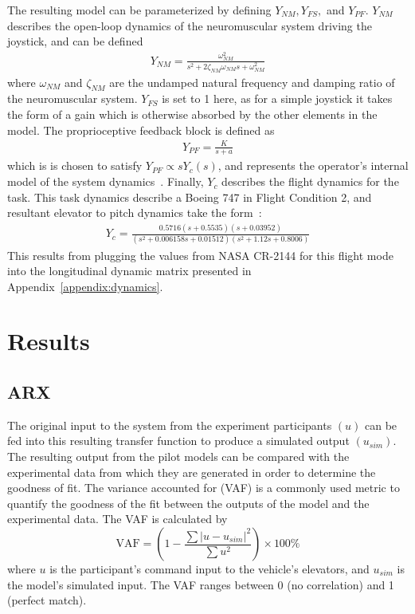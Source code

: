 The resulting model can be parameterized by defining $Y_{NM}, Y_{FS},$ and $Y_{PF}$.
$Y_{NM}$ describes the open-loop dynamics of the neuromuscular system driving the joystick, and can be defined
\begin{align}
    Y_{NM} = \frac{\omega^2_{NM}}{s^2 + 2 \zeta_{NM} \omega_{NM} s + \omega^2_{NM}}
\end{align}
where $\omega_{NM}$ and $\zeta_{NM}$ are the undamped natural frequency and damping ratio of the neuromuscular system.
$Y_{FS}$ is set to 1 here, as for a simple joystick it takes the form of a gain which is otherwise absorbed by the other elements in the model.
The proprioceptive feedback block is defined as
\begin{align} \label{eq:ypf}
    Y_{PF} = \frac{K}{s+a}
\end{align}
which is is chosen to satisfy $Y_{PF} \propto s Y_c (s)$, and represents the operator's internal model of the system dynamics~\citep{hess_unified_1997}.
Finally, $Y_c$ describes the flight dynamics for the task.
This task dynamics describe a Boeing 747 in Flight Condition 2, and resultant elevator to pitch dynamics take the form~\citep{heffley1972aircraft}:
\begin{align}
    Y_c = \frac{0.5716 (s+0.5535) (s+0.03952)}{(s^2 + 0.006158s + 0.01512) (s^2 + 1.12s + 0.8006)}
\end{align}
This results from plugging the values from NASA CR-2144 for this flight mode into the longitudinal dynamic matrix presented in Appendix~\ref{appendix:dynamics}.

\section{Results}

\subsection{ARX}
The original input to the system from the experiment participants $(u)$ can be fed into this resulting transfer function to produce a simulated output $(u_{sim})$.
The resulting output from the pilot models can be compared with the experimental data from which they are generated in order to determine the goodness of fit.
The variance accounted for (VAF) is a commonly used metric to quantify the goodness of the fit between the outputs of the model and the experimental data.
The VAF is calculated by
\begin{equation}
    \mbox{VAF} = \left( 1 - \dfrac{\sum{|u - u_{sim}|^2}} {\sum{u^2}} \right) \times \mbox{100\%}
\end{equation}
where $u$ is the participant's command input to the vehicle's elevators, and $u_{sim}$ is the model's simulated input.
The VAF ranges between 0 (no correlation) and 1 (perfect match).

